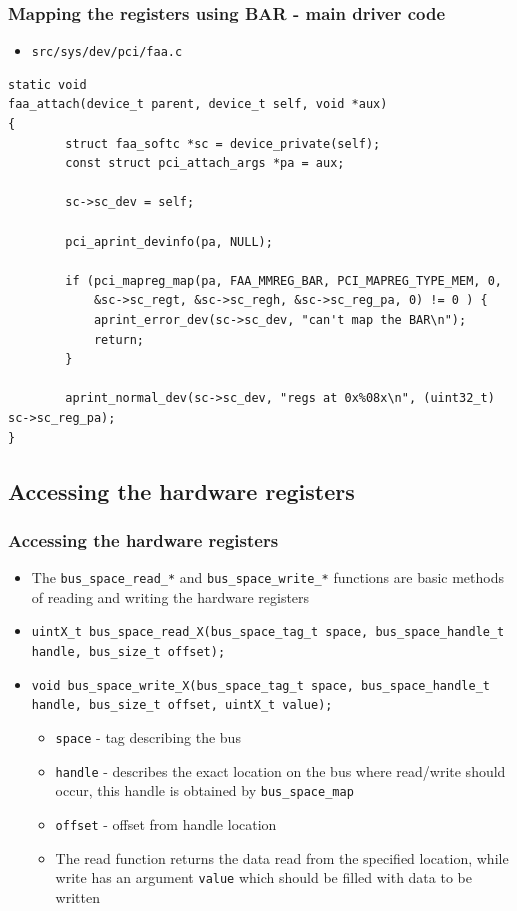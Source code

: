\documentclass[dvipsnames,table]{beamer}
\begin{document}
\begin{frame}[fragile]
\frametitle{Mapping the registers using BAR - main driver code}
\scriptsize
\begin{itemize}
	\item {\tt src/sys/dev/pci/faa.c}
\end{itemize}
\begin{lstlisting}
static void
faa_attach(device_t parent, device_t self, void *aux)
{
        struct faa_softc *sc = device_private(self);
        const struct pci_attach_args *pa = aux;

        sc->sc_dev = self;

        pci_aprint_devinfo(pa, NULL);

        if (pci_mapreg_map(pa, FAA_MMREG_BAR, PCI_MAPREG_TYPE_MEM, 0, 
            &sc->sc_regt, &sc->sc_regh, &sc->sc_reg_pa, 0) != 0 ) {
            aprint_error_dev(sc->sc_dev, "can't map the BAR\n");
            return;
        }

        aprint_normal_dev(sc->sc_dev, "regs at 0x%08x\n", (uint32_t) sc->sc_reg_pa);
}
\end{lstlisting}
\end{frame}

\subsection{Accessing the hardware registers}

\begin{frame}
\frametitle{Accessing the hardware registers}
\begin{itemize}
	\item The {\tt bus\_space\_read\_*} and {\tt bus\_space\_write\_*} functions are basic methods of reading and writing the hardware registers
	\item {\tt uintX\_t bus\_space\_read\_X(bus\_space\_tag\_t space, bus\_space\_handle\_t handle, bus\_size\_t offset);}
	\item {\tt void bus\_space\_write\_X(bus\_space\_tag\_t space, bus\_space\_handle\_t handle, bus\_size\_t offset, uintX\_t value);}
	\begin{itemize}
		\item {\tt space} - tag describing the bus
		\item {\tt handle} - describes the exact location on the bus where read/write should occur, this handle is obtained by {\tt bus\_space\_map}
		\item {\tt offset} - offset from handle location
		\item The read function returns the data read from the specified location, while write has an argument {\tt value} which should be filled with data to be written
	\end{itemize}
\end{itemize}
\end{frame}
\end{document}
